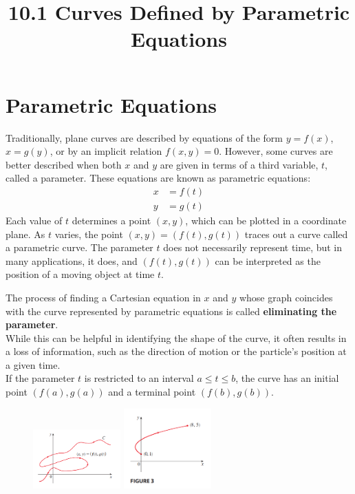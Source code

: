 \documentclass{article}
\title{10.1 Curves Defined by Parametric Equations}
\date{}
\author{}
\begin{document}
\maketitle
\section*{Parametric Equations}
Traditionally, plane curves are described by equations of the form $y=f(x)$, $x=g(y)$, or by an implicit relation $f(x,y)=0$. However, some curves are better described when both $x$ and $y$ are given in terms of a third variable, $t$, called a parameter. These equations are known as parametric equations:
\begin{align*}
    x &= f(t) \\
    y &= g(t)
\end{align*}
Each value of $t$ determines a point $(x,y)$, which can be plotted in a coordinate plane. As $t$ varies, the point $(x,y)=(f(t),g(t))$ traces out a curve called a parametric curve. The parameter $t$ does not necessarily represent time, but in many applications, it does, and $(f(t),g(t))$ can be interpreted as the position of a moving object at time $t$.

The process of finding a Cartesian equation in $x$ and $y$ whose graph coincides with the curve represented by parametric equations is called \textbf{eliminating the parameter}. 
\\While this can be helpful in identifying the shape of the curve, it often results in a loss of information, such as the direction of motion or the particle's position at a given time.
\\If the parameter $t$ is restricted to an interval $a \le t \le b$, the curve has an initial point $(f(a),g(a))$ and a terminal point $(f(b),g(b))$.
\begin{figure}[htbp]
    \centering
    \includegraphics[width=0.3\textwidth]{graph10.png}
    \includegraphics[width=0.3\textwidth]{graph11.png}  %
\end{figure}
\end{document}
